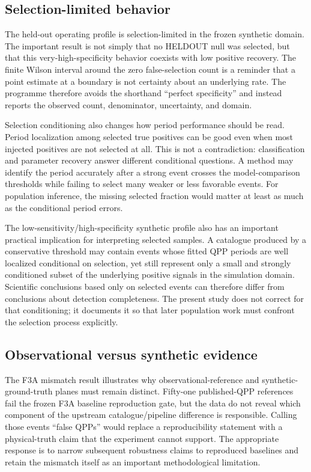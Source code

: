 \documentclass[11pt,a4paper]{article}
\begin{document}
\subsection{Selection-limited behavior}
The held-out operating profile is selection-limited in the frozen synthetic domain. The important result is not simply that no HELDOUT null was selected, but that this very-high-specificity behavior coexists with low positive recovery. The finite Wilson interval around the zero false-selection count is a reminder that a point estimate at a boundary is not certainty about an underlying rate. The programme therefore avoids the shorthand ``perfect specificity'' and instead reports the observed count, denominator, uncertainty, and domain.

Selection conditioning also changes how period performance should be read. Period localization among selected true positives can be good even when most injected positives are not selected at all. This is not a contradiction: classification and parameter recovery answer different conditional questions. A method may identify the period accurately after a strong event crosses the model-comparison thresholds while failing to select many weaker or less favorable events. For population inference, the missing selected fraction would matter at least as much as the conditional period errors.

The low-sensitivity/high-specificity synthetic profile also has an important practical implication for interpreting selected samples. A catalogue produced by a conservative threshold may contain events whose fitted QPP periods are well localized conditional on selection, yet still represent only a small and strongly conditioned subset of the underlying positive signals in the simulation domain. Scientific conclusions based only on selected events can therefore differ from conclusions about detection completeness. The present study does not correct for that conditioning; it documents it so that later population work must confront the selection process explicitly.

\subsection{Observational versus synthetic evidence}
The F3A mismatch result illustrates why observational-reference and synthetic-ground-truth planes must remain distinct. Fifty-one published-QPP references fail the frozen F3A baseline reproduction gate, but the data do not reveal which component of the upstream catalogue/pipeline difference is responsible. Calling those events ``false QPPs'' would replace a reproducibility statement with a physical-truth claim that the experiment cannot support. The appropriate response is to narrow subsequent robustness claims to reproduced baselines and retain the mismatch itself as an important methodological limitation.
\end{document}

